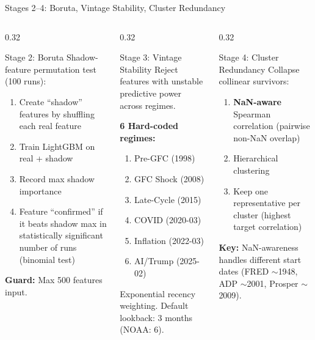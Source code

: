 \documentclass[aspectratio=169,10pt]{beamer}
\begin{document}
\begin{frame}{Stages 2--4: Boruta, Vintage Stability, Cluster Redundancy}
\begin{columns}[T]
\begin{column}{0.32\textwidth}
\begin{block}{Stage 2: Boruta}
\footnotesize
Shadow-feature permutation test (100 runs):
\begin{enumerate}\scriptsize
  \item Create ``shadow'' features by shuffling each real feature
  \item Train LightGBM on real + shadow
  \item Record max shadow importance
  \item Feature ``confirmed'' if it beats shadow max in statistically significant number of runs (binomial test)
\end{enumerate}
\textbf{Guard:} Max 500 features input.
\end{block}
\end{column}
\begin{column}{0.32\textwidth}
\begin{block}{Stage 3: Vintage Stability}
\footnotesize
Reject features with unstable predictive power across regimes.

\textbf{6 Hard-coded regimes:}
\begin{enumerate}\scriptsize
  \item Pre-GFC (1998)
  \item GFC Shock (2008)
  \item Late-Cycle (2015)
  \item COVID (2020-03)
  \item Inflation (2022-03)
  \item AI/Trump (2025-02)
\end{enumerate}
Exponential recency weighting. Default lookback: 3 months (NOAA: 6).
\end{block}
\end{column}
\begin{column}{0.32\textwidth}
\begin{block}{Stage 4: Cluster Redundancy}
\footnotesize
Collapse collinear survivors:
\begin{enumerate}\scriptsize
  \item \textbf{NaN-aware} Spearman correlation (pairwise non-NaN overlap)
  \item Hierarchical clustering
  \item Keep one representative per cluster (highest target correlation)
\end{enumerate}
\textbf{Key:} NaN-awareness handles different start dates (FRED $\sim$1948, ADP $\sim$2001, Prosper $\sim$2009).
\end{block}
\end{column}
\end{columns}
\end{frame}
\end{document}
